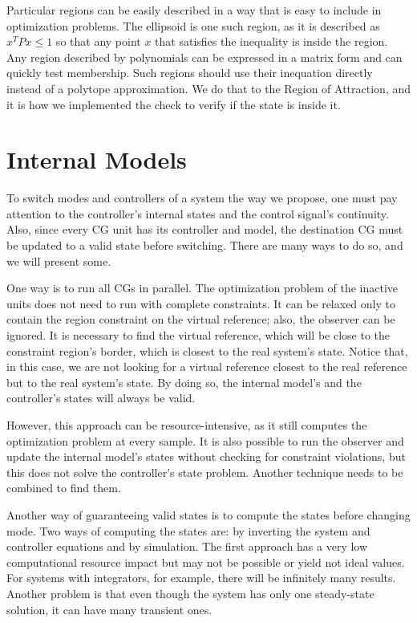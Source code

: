 Particular regions can be easily described in a way that is easy to include in
optimization problems. The ellipsoid is one such region, as it is described as
\(x^{T}Px\leq{}1\) so that any point \(x\) that satisfies the inequality is inside
the region. Any region described by polynomials can be expressed in a matrix
form and can quickly test membership. Such regions should use their inequation
directly instead of a polytope approximation.  We do that to the Region of
Attraction, and it is how we implemented the check to verify if the state is
inside it.

\section{Internal Models}%
\label{sec:internal-models}

To switch modes and controllers of a system the way we propose, one must pay
attention to the controller's internal states and the control signal's
continuity. Also, since every CG unit has its controller and model, the
destination CG must be updated to a valid state before switching. There are many
ways to do so, and we will present some.

One way is to run all CGs in parallel. The optimization problem of the inactive
units does not need to run with complete constraints. It can be relaxed only to
contain the region constraint on the virtual reference; also, the observer can
be ignored. It is necessary to find the virtual reference, which will be close
to the constraint region's border, which is closest to the real system's state.
Notice that, in this case, we are not looking for a virtual reference closest to
the real reference but to the real system's state. By doing so, the internal
model's and the controller's states will always be valid.

However, this approach can be resource-intensive, as it still computes the
optimization problem at every sample. It is also possible to run the observer
and update the internal model's states without checking for constraint
violations, but this does not solve the controller's state problem. Another
technique needs to be combined to find them.

Another way of guaranteeing valid states is to compute the states before
changing mode. Two ways of computing the states are: by inverting the system and
controller equations and by simulation. The first approach has a very low
computational resource impact but may not be possible or yield not ideal values.
For systems with integrators, for example, there will be infinitely many
results. Another problem is that even though the system has only one
steady-state solution, it can have many transient ones.

